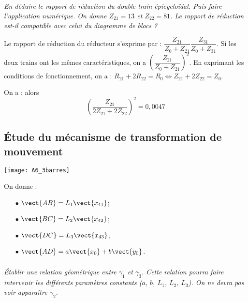 \begin{multicols}{2}
\subparagraph{}
\textit{En déduire le rapport de réduction du double train épicycloïdal. Puis faire l'application numérique. On donne $Z_{21}=13$ et $Z_{22}=81$. Le rapport de réduction est-il compatible avec celui du diagramme de blocs ?}

\ifprof
\begin{corrige}

Le rapport de réduction du réducteur s'exprime par : 
$\dfrac{Z_{21}}{Z_{0}+Z_{21}}\dfrac{Z_{31}}{Z_{0}+Z_{31}}$. Si les deux trains ont les mêmes caractéristiques, on a $\left(\dfrac{Z_{21}}{Z_{0}+Z_{21}}\right)^2$. 
En exprimant les conditions de fonctionnement, on a : 
$R_{21}+2R_{22}=R_0\Leftrightarrow Z_{21}+2Z_{22}=Z_0$. %

On a : alors 
$$
\left(\dfrac{Z_{21}}{2 Z_{21}+2Z_{22}}\right)^2=0,0047%
$$
\end{corrige}
\else \fi

\subsection*{Étude du mécanisme de transformation de mouvement}

\ifprof
\else

\begin{center}
\texttt{[image: A6\_3barres]}
\end{center}

On donne : 

\begin{minipage}[c]{.45\linewidth}
\begin{itemize}
\item [$\bullet$] $\vect{AB}=L_1\vect{x_{41}}$;
\item [$\bullet$] $\vect{BC}=L_2\vect{x_{42}}$;
\end{itemize}
\end{minipage}\hfill
\begin{minipage}[c]{.45\linewidth}
\begin{itemize}
\item [$\bullet$] $\vect{DC}=L_3\vect{x_{43}}$;
\item [$\bullet$] $\vect{AD}=a\vect{x_{0}}+b\vect{y_{0}}$.
\end{itemize}
\end{minipage}

\fi
\subparagraph{}
\textit{Établir une relation géométrique entre $\gamma_1$ et $\gamma_3$. Cette relation pourra faire intervenir les différents paramètres constants ($a$, $b$, $L_1$, $L_2$, $L_3$). On ne devra pas voir apparaître $\gamma_2$.}


\end{multicols}
